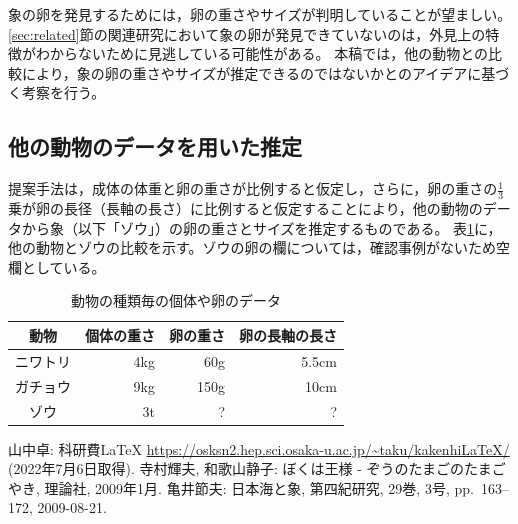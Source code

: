\documentclass[dvipdfmx]{jsarticle}
\begin{document}
象の卵を発見するためには，卵の重さやサイズが判明していることが望ましい。
\ref{sec:related}節の関連研究\cite{teramura2009}において象の卵が発見できていないのは，外見上の特徴がわからないために見逃している可能性がある。 %
本稿では，他の動物との比較により，象の卵の重さやサイズが推定できるのではないかとのアイデアに基づく考察を行う。

\subsection{他の動物のデータを用いた推定}

提案手法は，成体の体重と卵の重さが比例すると仮定し，さらに，卵の重さの$\frac{1}{3}$乗が卵の長径（長軸の長さ）に比例すると仮定することにより，他の動物のデータから象（以下「ゾウ」）の卵の重さとサイズを推定するものである。
表\ref{tab:egg_sizes}に，他の動物とゾウの比較を示す。ゾウの卵の欄については，確認事例がないため空欄としている。 %

\begin{table}[htbp]
  \centering
  \caption{動物の種類毎の個体や卵のデータ}
  \label{tab:egg_sizes} %
  \begin{tabular}{|c|r|r|r|}
    \hline
    動物 & 個体の重さ & 卵の重さ & 卵の長軸の長さ \\ \hline \hline
    ニワトリ & 4kg & 60g & 5.5cm \\ \hline
    ガチョウ & 9kg & 150g & 10cm \\ \hline
    ゾウ & 3t & ? & ? \\ \hline
  \end{tabular}
\end{table}


\begin{thebibliography}{99} %
 山中卓: 科研費LaTeX \url{https://osksn2.hep.sci.osaka-u.ac.jp/~taku/kakenhiLaTeX/} (2022年7月6日取得). %
 寺村輝夫, 和歌山静子: ぼくは王様 - ぞうのたまごのたまごやき, 理論社, 2009年1月. %
 亀井節夫: 日本海と象, 第四紀研究, 29巻, 3号, pp.~163--172, 2009-08-21. %
\end{thebibliography}
\end{document}
